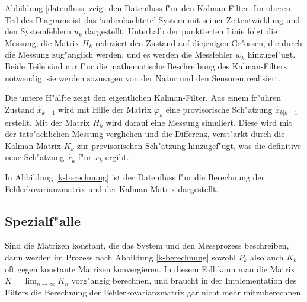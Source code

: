 Abbildung \ref{datenfluss} zeigt den Datenfluss f"ur den Kalman Filter.
Im oberen Teil des Diagrams ist das `unbeobachtete' System mit seiner
Zeitentwicklung und den Systemfehlern $u_k$ dargestellt.
Unterhalb der
punktierten Linie folgt die Messung, die Matrix $H_k$ reduziert den Zustand
auf diejenigen Gr"ossen, die durch die Messung zug"anglich werden, und es
werden die Messfehler $w_k$ hinzugef"ugt.
Beide Teile sind nur f"ur die
mathematische Beschreibung des Kalman-Filters notwendig, sie werden
sozusagen von der Natur und den Sensoren realisiert.

Die untere H"alfte zeigt den eigentlichen Kalman-Filter.
Aus einem fr"uhren Zustand $\hat x_{k-1}$ wird mit Hilfe der Matrix
$\varphi_k$ eine provisorische Sch"atzung $\hat x_{k|k-1}$ erstellt.
Mit der Matrix $H_k$ wird darauf eine Messung simuliert.
Diese wird
mit der tats"achlichen Messung verglichen und die Differenz, verst"arkt durch
die Kalman-Matrix $K_k$ zur provisorischen Sch"atzung hinzugef"ugt, was
die definitive neue Sch"atzung $\hat x_k$ f"ur $x_k$ ergibt.

In Abbildung \ref{k-berechnung} ist der Datenfluss f"ur die Berechnung
der Fehlerkovarianzmatrix und der Kalman-Matrix dargestellt.

\subsection{Spezialf"alle}
Sind die Matrizen konstant, die das System und den Messprozess beschreiben, 
dann werden im Prozess nach Abbildung \ref{k-berechnung} sowohl $P_k$ also auch
$K_k$ oft gegen konstante Matrizen konvergieren.
In diesem Fall kann man
die Matrix $K=\lim_{n\to\infty}K_n$ vorg"angig berechnen, und braucht
in der Implementation des Filters die Berechnung der Fehlerkovarianzmatrix
gar nicht mehr mitzuberechnen. 

